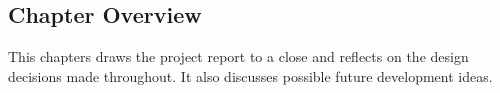 \documentclass[12pt,a4paper]{article}
\begin{document}
	\subsection{Chapter Overview}
		This chapters draws the project report to a close and reflects on the design decisions made throughout.
It also discusses possible future development ideas.
\begin{comment}
	\subsection{Project Overview}
	The system achieved all of its proposed priority 1 and priority 2 functional requirements and even some
priority 3 outlined in Section \ref{sec:prioty}.
However, the initial project plan and gannt chart had to be modified as the project became about
a month behind due to underestimations on the time to implement some desired features. This meant
that some of the lower priority requirements had to be scrapped.
	\subsection{Further Development}
	This project was developed under time constraints of 120 hours. Therefore the proposed features
specified in the requirements were what the developer thought to be realistic targets.
However, if more time became available the following could be implemented.
	\subsubsection{Graphical User Interface (GUI)}
	Currently the GUI was adequate to do the job but maybe the GUI could have had a more appealing
look and feel. This all beckons on whether or not Java was the best programming language to use to
generate the best looking GUI. Maybe a web developed GUI could have been a better alternative but
with the developer having little experience in web development this would not have been ideal.
	\subsubsection{Table Management}
	A feature that was thought of as a possibility but never documented past the design stage was the use
of a table management feature. This would give the system the ability to reserve and allocate tables.
The table data could then be used to help predict how busy the restaurant may be and help prepare
the staff rota.
	\subsection{Reflection}
	On reflection, even though the majority of the proposed features were completed and the project was
deemed a huge success, the author felt that he could have been more disciplined in keeping to the plan.
He also felt that the proposed features were slightly unrealistic and some even unnecessary.
For the general project, the author felt that important aspects of research were not undertaken
including interviews with restaurant owners and user questionnaires. This would have provided good
insight into existing solutions.

\end{comment}
\end{document}

